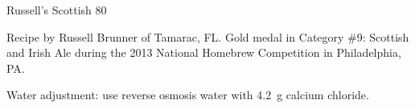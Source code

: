 \begin{recipe}{Russell's Scottish 80}

\begin{aboutblock}
Recipe by Russell Brunner of Tamarac, FL. Gold medal in Category \#9: Scottish
and Irish Ale during the 2013 National Homebrew Competition in Philadelphia, PA.
\sourceaha
\end{aboutblock}


\begin{methodandtiming}

\begin{mashsteps}
\end{mashsteps}

\begin{fermentationsteps}
\end{fermentationsteps}

\begin{directions}
Water adjustment: use reverse osmosis water with 4.2~g calcium chloride.
\end{directions}

\end{methodandtiming}

\recipebreak

\begin{ingredientsblock}

\begin{malts}
\end{malts}

\begin{hops}
\end{hops}


\end{ingredientsblock}

\end{recipe}

